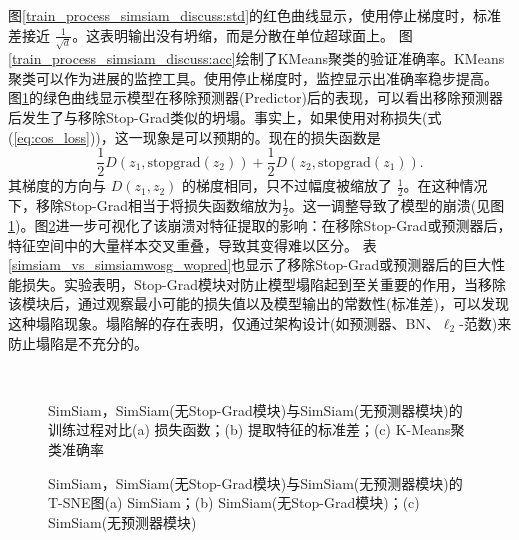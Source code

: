 \documentclass[master]{thesis-uestc}
\begin{document}
图\ref{train_process_simsiam_discuss:std}的红色曲线显示，使用停止梯度时，标准差接近 \( \frac{1}{\sqrt{d}} \)。这表明输出没有坍缩，而是分散在单位超球面上。
图\ref{train_process_simsiam_discuss:acc}绘制了KMeans聚类的验证准确率。KMeans聚类可以作为进展的监控工具。使用停止梯度时，监控显示出准确率稳步提高。
图\ref{train_process_simsiam_discuss}的绿色曲线显示模型在移除预测器(Predictor)后的表现，可以看出移除预测器后发生了与移除Stop-Grad类似的坍塌。事实上，如果使用对称损失(式(\ref{eq:cos_loss}))，这一现象是可以预期的。现在的损失函数是
\begin{equation}
    \frac{1}{2}D(z_1, \text{stopgrad}(z_2)) + \frac{1}{2}D(z_2, \text{stopgrad}(z_1)).
\end{equation}
其梯度的方向与 $D(z_1, z_2)$ 的梯度相同，只不过幅度被缩放了 $\frac{1}{2}$。在这种情况下，移除Stop-Grad相当于将损失函数缩放为$\frac{1}{2}$。这一调整导致了模型的崩溃(见图\ref{train_process_simsiam_discuss})。图\ref{tsne_simsiam_discuss}进一步可视化了该崩溃对特征提取的影响：在移除Stop-Grad或预测器后，特征空间中的大量样本交叉重叠，导致其变得难以区分。
表\ref{simsiam_vs_simsiamwosg_wopred}也显示了移除Stop-Grad或预测器后的巨大性能损失。实验表明，Stop-Grad模块对防止模型塌陷起到至关重要的作用，当移除该模块后，通过观察最小可能的损失值以及模型输出的常数性(标准差)，可以发现这种塌陷现象。塌陷解的存在表明，仅通过架构设计(如预测器、BN、$\ell_{2}$-范数)来防止塌陷是不充分的。

\begin{figure}
    \centering
    \\
    \caption{SimSiam，SimSiam(无Stop-Grad模块)与SimSiam(无预测器模块)的训练过程对比(a) 损失函数；(b) 提取特征的标准差；(c) K-Means聚类准确率}
    \label{train_process_simsiam_discuss}
\end{figure}

\begin{figure}
    \centering
    \caption{SimSiam，SimSiam(无Stop-Grad模块)与SimSiam(无预测器模块)的T-SNE图(a) SimSiam；(b) SimSiam(无Stop-Grad模块)；(c) SimSiam(无预测器模块)}
    \label{tsne_simsiam_discuss}
\end{figure}
\end{document}
